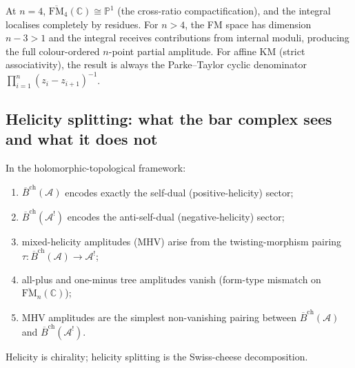 \documentclass[11pt]{article}
\newcommand{\cA}{\mathcal{A}}
\newcommand{\barB}{\overline{B}}
\newcommand{\C}{\mathbb{C}}
\newcommand{\bP}{\mathbb{P}}
\begin{document}
\begin{remark}[Why $n = 4$ is special]
At $n = 4$, $\overline{\mathrm{FM}}_4(\C) \cong \bP^1$
(the cross-ratio compactification), and the integral localises
completely by residues.  For $n > 4$, the FM space has
dimension $n - 3 > 1$ and the integral receives contributions
from internal moduli, producing the full colour-ordered
$n$-point partial amplitude.  For affine KM (strict
associativity), the result is always the Parke--Taylor
cyclic denominator $\prod_{i=1}^n (z_i - z_{i+1})^{-1}$.
\end{remark}

\subsection{Helicity splitting: what the bar complex sees and what it does not}
\label{subsec:helicity-splitting-cel}

\begin{theorem}
\label{thm:helicity-chirality-cel}
In the holomorphic-topological framework:
\begin{enumerate}[label=\textup{(\roman*)}]
\item $\barB^{\mathrm{ch}}(\cA)$ encodes exactly the self-dual
  (positive-helicity) sector;
\item $\barB^{\mathrm{ch}}(\cA^!)$ encodes the anti-self-dual
  (negative-helicity) sector;
\item mixed-helicity amplitudes (MHV) arise from the twisting-morphism
  pairing $\tau \colon \barB^{\mathrm{ch}}(\cA) \to \cA^!$;
\item all-plus and one-minus tree amplitudes vanish (form-type mismatch
  on $\overline{\mathrm{FM}}_n(\C)$);
\item MHV amplitudes are the simplest non-vanishing pairing between
  $\barB^{\mathrm{ch}}(\cA)$ and $\barB^{\mathrm{ch}}(\cA^!)$.
\end{enumerate}
Helicity is chirality; helicity splitting is the Swiss-cheese
decomposition.
\end{theorem}
\end{document}
